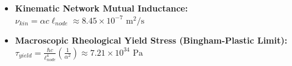 \begin{itemize}
    \item \textbf{Kinematic Network Mutual Inductance:} $\nu_{kin} = \alpha c \ell_{node} \approx 8.45 \times 10^{-7} \text{ m}^2/\text{s}$
    \item \textbf{Macroscopic Rheological Yield Stress (Bingham-Plastic Limit):} $\tau_{yield} = \frac{\hbar c}{\ell_{node}^4} \left( \frac{1}{\alpha^2} \right) \approx 7.21 \times 10^{34}\text{ Pa}$
\end{itemize}


